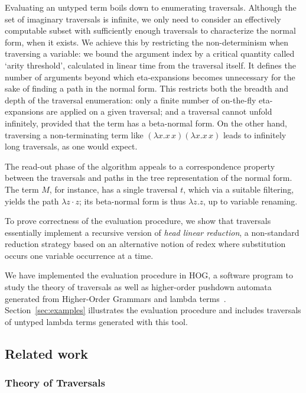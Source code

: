 \documentclass{elsarticle}
\theoremstyle{plain}
\theoremstyle{definition}
\theoremstyle{remark}
\begin{document}
Evaluating an untyped term boils down to enumerating traversals.
 Although the set of imaginary traversals is infinite, we only need to consider an effectively computable subset with sufficiently enough traversals to characterize the normal form, when it exists.
We achieve this by restricting the non-determinism when traversing a variable: we bound the argument index by a critical quantity called `arity threshold', calculated in linear time from the traversal itself. It defines the number of arguments beyond which eta-expansions becomes unnecessary for the sake of finding a path in the normal form. This restricts both the breadth and depth of the traversal enumeration: only a finite number of on-the-fly eta-expansions are applied on a given traversal; and a traversal cannot unfold infinitely, provided that the term has a beta-normal form.
On the other hand, traversing a non-terminating term like $(\lambda x. x\,x)(\lambda x. x\,x)$ leads to infinitely long traversals, as one would expect.

The read-out phase of the algorithm appeals to a correspondence property between the traversals and paths in the tree representation of the normal form. The term $M$, for instance, has a single traversal $t$, which via a suitable filtering, yields the path $\lambda z \cdot z$; its beta-normal form is thus $\lambda z. z$, up to variable renaming.

 To prove correctness of the evaluation procedure, we show that traversals essentially implement a recursive version of \emph{head linear reduction}, a non-standard reduction strategy based on an alternative notion of redex
  where substitution occurs one variable occurrence at a time.

 We have implemented the evaluation procedure in HOG, a software program to study the theory of traversals as well as higher-order pushdown automata generated from Higher-Order Grammars and lambda terms~\cite{BlumGalop2008,Blum-HogTool}.  Section~\ref{sec:examples} illustrates the evaluation procedure and includes traversals of untyped lambda terms generated with this tool.

\subsection{Related work}

\subsubsection{Theory of Traversals}
\end{document}
